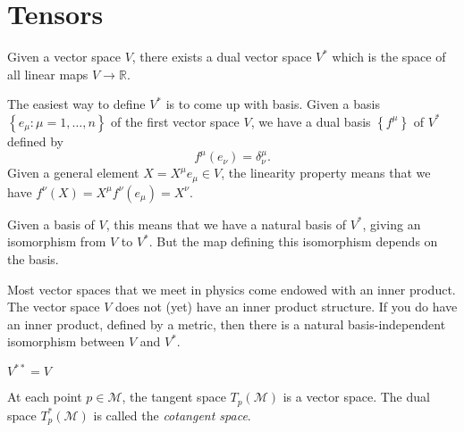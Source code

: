 
\section{Tensors}%
\label{sec:tensors}

\begin{definition}
  Given a vector space $V$, there exists a dual vector space $V^*$ which is the space of all linear maps $V \to \mathbb{R}$.
\end{definition}

The easiest way to define $V^*$ is to come up with basis.
Given a basis $ \left\{ e_\mu: \mu = 1, \ldots, n \right\}$ of the first vector space $V$, we have a dual basis
$\left\{ f^\mu \right\}$ of $V^*$ defined by
\begin{equation}
  f^\mu(e_\nu) = \delta^\mu_\nu.
\end{equation}
Given a general element $X = X^\mu e_\mu \in V$, the linearity property means that we have $f^\nu(X) = X^\mu f^\nu (e_\mu) = X^\nu$.
\begin{leftbar}
  \begin{remark}
    Given a basis of $V$, this means that we have a natural basis of $V^*$, giving an isomorphism from $V$ to $V^*$. But the map defining this isomorphism depends on the basis.
  \end{remark}
\end{leftbar}

\begin{leftbar}
  \begin{remark}
    Most vector spaces that we meet in physics come endowed with an inner product. The vector space $V$ does not (yet) have an inner product structure.
    If you do have an inner product, defined by a metric, then there is a natural basis-independent isomorphism between $V$ and $V^*$.
  \end{remark}
\end{leftbar}

\begin{leftbar}
  \begin{remark}
    $V^{* *} = V$
  \end{remark}
\end{leftbar}

\begin{definition}
  At each point $p \in \mathcal{M}$, the tangent space $T_p(\mathcal{M})$ is a vector space. The dual space $T^*_p (\mathcal{M})$ is called the \emph{cotangent space}.
\end{definition}

